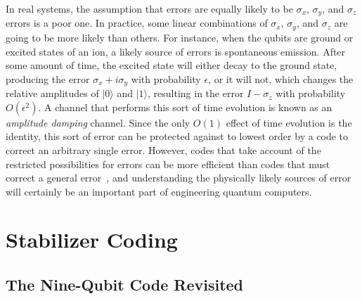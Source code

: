 \documentclass{report}
\newcommand{\ket}[1]{|{#1}\rangle}
\newcommand{\X}{\sigma_x}
\newcommand{\Z}{\sigma_z}
\newcommand{\Y}{\sigma_y}
\begin{document}
In real systems, the assumption that errors are equally likely to be $\X$,
$\Y$, and $\Z$ errors is a poor one.  In practice, some linear combinations
of $\X$, $\Y$, and $\Z$ are going to be more likely than others.  For instance,
when the qubits are ground or excited states of an ion, a likely source of
errors is spontaneous emission.  After some amount of time, the excited
state will either decay to the ground state, producing the error $\X + i\Y$
with probability $\epsilon$, or it will not, which changes the relative 
amplitudes of $\ket{0}$ and $\ket{1}$, resulting in the error $I - \Z$ with
probability $O (\epsilon^2)$.  A channel that performs this sort of time
evolution is known as an {\em amplitude damping} channel.  Since the only 
$O(1)$ effect of time evolution is the identity, this sort of error can be 
protected against to lowest order by a code to correct an arbitrary single 
error.  However, codes that take account of the restricted possibilities
for errors can be more efficient than codes that must correct a general
error~\cite{leung}, and understanding the physically likely sources of
error will certainly be an important part of engineering quantum computers.

\chapter{Stabilizer Coding}
\label{chap-stabilizers}

\section{The Nine-Qubit Code Revisited}
\end{document}
